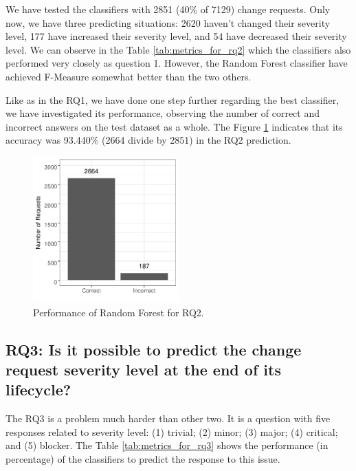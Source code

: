 \documentclass[10pt, conference]{IEEEtran}
\begin{document}
We have tested the classifiers with 2851 (40\% of 7129) change requests. Only now, we have three predicting situations: 2620 haven't changed their severity level, 177 have increased their severity level, and 54 have decreased their severity level. We can observe in the Table \ref{tab:metrics_for_rq2} which the classifiers also performed very closely as question 1. However, the Random Forest classifier have achieved F-Measure somewhat better than the two others.

Like as in the RQ1, we have done one step further regarding the best classifier, we have investigated its performance, observing the number of correct and incorrect answers on the test dataset as a whole. The Figure \ref{fig:rf_performance_for_q2} indicates that its accuracy was 93.440\% (2664 divide by 2851) in the RQ2 prediction. 

\begin{figure}[!hbt]
   \label{fig:rf_performance_for_q2}
  \includegraphics[width=0.5\textwidth, height=0.42\textwidth]{figures/rf_performance_for_q2.pdf}
  \caption{Performance of Random Forest for RQ2.}
\end{figure}

\subsection{RQ3: Is it possible to predict the change request severity level at the end of its lifecycle?}

The RQ3 is a problem much harder than other two. It is a question with five responses related to severity level: (1) trivial; (2) minor; (3) major; (4) critical; and (5) blocker. The Table \ref{tab:metrics_for_rq3} shows the performance (in percentage) of the classifiers to predict the response to this issue.
\end{document}
